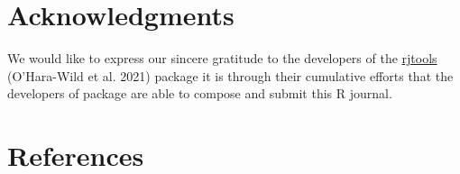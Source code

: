 \hypertarget{acknowledgments}{%
\section{Acknowledgments}\label{acknowledgments}}

We would like to express our sincere gratitude to the developers of the \href{https://github.com/rjournal/rjtools}{rjtools} (O'Hara-Wild et al. 2021) package it is through their cumulative efforts that the developers of  package are able to compose and submit this R journal.

\hypertarget{references}{%
\section*{References}\label{references}}

